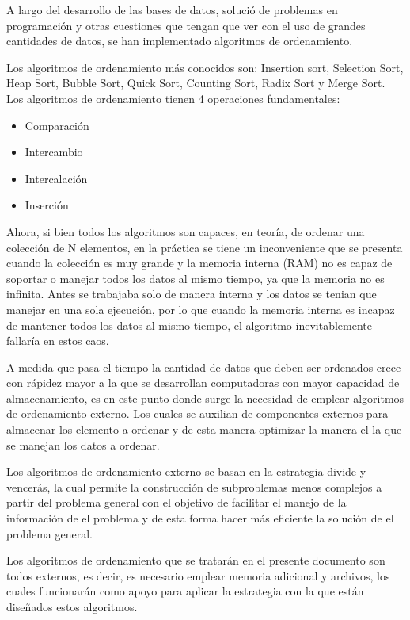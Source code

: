 \documentclass[letterpaper,12pt]{extarticle}
\begin{document}
\noindent A largo del desarrollo de las bases de datos, solució de problemas en programación y otras cuestiones que tengan que ver con el uso de grandes cantidades de datos, se han implementado algoritmos de ordenamiento.

Los algoritmos de ordenamiento más conocidos son: Insertion sort, Selection Sort, Heap Sort, Bubble Sort, Quick Sort, Counting Sort, Radix Sort y Merge Sort.
Los algoritmos de ordenamiento tienen 4 operaciones fundamentales: 
\begin{itemize}

\item Comparación            
\item Intercambio 
\item Intercalación           
\item Inserción

 
\end{itemize}

Ahora, si bien todos los algoritmos son capaces, en teoría, de ordenar una colección de N elementos, en la práctica se tiene un inconveniente que se presenta cuando la colección es muy grande y la memoria interna (RAM) no es capaz de soportar o manejar todos los datos al mismo tiempo, ya que la memoria no es infinita. Antes se trabajaba solo  de manera interna y los datos se  tenian que manejar en una sola ejecución, por lo que cuando la memoria interna es incapaz de mantener todos los datos al mismo tiempo, el algoritmo inevitablemente fallaría en estos caos.

 A medida que pasa el tiempo la cantidad de datos que deben ser ordenados crece con rápidez mayor a la que se desarrollan computadoras con mayor capacidad de almacenamiento, es en este punto donde surge la necesidad de emplear algoritmos de ordenamiento externo. Los cuales se auxilian de componentes externos para almacenar los elemento a ordenar y de esta manera optimizar la manera el la que se manejan los datos a ordenar.

Los algoritmos de ordenamiento externo se basan en la estrategia divide y vencerás, la cual permite la construcción de subproblemas menos complejos  a partir del problema general  con el objetivo de facilitar el  manejo de la información de el problema y de esta forma hacer más eficiente la solución de el problema general.

Los algoritmos de ordenamiento que se tratarán en el presente documento son todos externos, es decir, es necesario emplear memoria adicional y archivos, los cuales funcionarán como apoyo para aplicar la estrategia con la que están diseñados estos algoritmos. 
\end{document}
